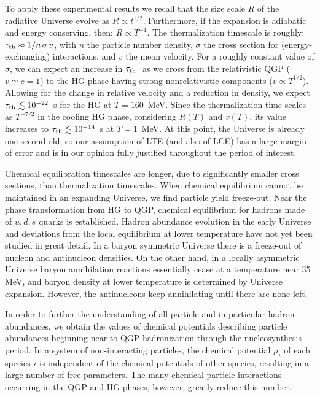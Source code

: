 \begin{mdframed}[linecolor=gray,roundcorner=12pt,backgroundcolor=Dandelion!15,linewidth=1pt,leftmargin=0cm,rightmargin=0cm,topline=true,bottomline=true,skipabove=12pt]
To  apply these experimental results we recall that the size scale $R$  of the radiative Universe  evolve as $R \propto t^{1/2}$. Furthermore, if the expansion is adiabatic and energy conserving, then: $R \propto T^{-1}$. The thermalization timescale is roughly: $\tau_{\rm th}\approx   {1}/{n\, \sigma\, v}$, with $n$ the particle number density, $\sigma$ the cross section for (energy-exchanging) interactions, and $v$ the mean velocity. For a roughly constant value of $\sigma$, we can expect an increase in $\tau_{\rm th}\ $ as we cross from the relativistic QGP ($v \simeq c = 1$) to the HG  phase having strong nonrelativistic components ($v \propto T^{1/2}$). Allowing for the change in relative velocity and  a reduction in density, we expect $\tau_{\rm th}\lesssim 10^{-22}$~s for the HG at $T = 160$~MeV. Since the thermalization time scales as $T^{-7/2}$  in the cooling HG phase, considering $R(T)$ and $v(T)$, its value increases to $\tau_{\rm th}\lesssim 10^{-14}$~s at $T=1$~MeV. At this point, the Universe is already one second old, so our assumption of LTE (and also of LCE) has a large margin of error and is in our opinion fully justified throughout the period of interest.

Chemical equilibration timescales are longer, due to  significantly smaller cross sections, than thermalization timescales. When chemical equilibrium cannot be  maintained in an expanding Universe, we find particle yield freeze-out. Near the phase transformation from HG to QGP, chemical equilibrium for hadrons made of $u,d,s$ quarks is established. Hadron abundance evolution in the early Universe and deviations from the local equilibrium at lower temperature have not yet been studied in great detail. In a baryon symmetric Universe there is a freeze-out of nucleon and antinucleon densities. On the other hand, in a locally asymmetric Universe  baryon annihilation reactions essentially cease at a temperature near 35 MeV, and baryon density at lower temperature is  determined by Universe expansion. However, the antinucleons keep annihilating  until there are none left. 

In order to further the  understanding of all particle and in particular hadron abundances, we obtain the values of chemical potentials describing particle abundances beginning near to QGP hadronization through the nucleosynthesis period. In a system of non-interacting particles, the chemical potential $\mu_i$ of each species $i$ is independent of the chemical potentials of other species, resulting in a large number of free parameters. The many chemical particle interactions occurring in the QGP and HG phases, however, greatly reduce this number.


\end{mdframed}
